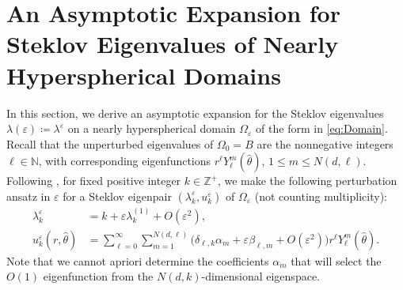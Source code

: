 \documentclass[11pt]{amsart}
\theoremstyle{definition}
\theoremstyle{plain}
\theoremstyle{remark}
\newcommand{\Z}{\mathbb{Z}}
\newcommand{\N}{\mathbb{N}}
\newcommand{\vareps}{\varepsilon}
\begin{document}


\section{An Asymptotic Expansion for Steklov Eigenvalues of Nearly Hyperspherical Domains} \label{sec:asymptotic} 
In this section, we derive an asymptotic expansion for the Steklov eigenvalues $\lambda(\vareps)\coloneqq \lambda^\vareps$ on a nearly hyperspherical domain $\Omega_\vareps$ of the form in \eqref{eq:Domain}. Recall that the unperturbed eigenvalues of $\Omega_0 = B$ are the nonnegative integers $\ell\in\N$, with corresponding eigenfunctions $r^\ell Y_\ell^m(\hat\theta)$, $1\le m\le N(d, \ell)$. Following \cite{viator2022}, for fixed positive integer $k\in\Z^+$, we make the following perturbation ansatz in $\vareps$ for a Steklov eigenpair $(\lambda_k^\vareps, u_k^\vareps)$ of $\Omega_\vareps$ (not counting multiplicity): 
\begin{subequations} \label{eq:Pert_ansatz} 
\begin{align} 
\label{eq:Pert_ansatz1} \lambda_k^\vareps & = k + \vareps \lambda_k^{(1)} + O(\vareps^2), \\ 
\label{eq:Pert_ansatz2} u_k^\vareps(r, \hat\theta) & = \sum_{\ell = 0}^\infty\sum_{m = 1}^{N(d, \ell)} \Big(\delta_{\ell, k}\alpha_m + \vareps\beta_{\ell, m} + O(\vareps^2)\Big)r^\ell Y_\ell^m(\hat\theta). 
\end{align} 
\end{subequations} 
Note that we cannot apriori determine the coefficients $\alpha_m$ that will select the $O(1)$ eigenfunction from the $N(d, k)$-dimensional eigenspace. 
\end{document}

